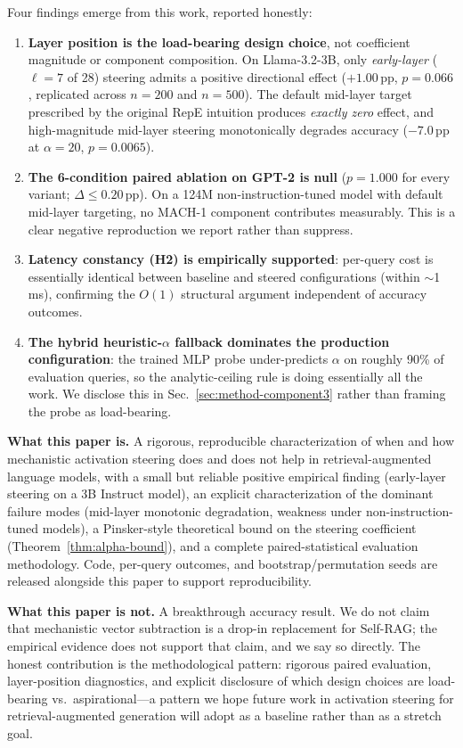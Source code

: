 \documentclass[conference]{IEEEtran}
\begin{document}
Four findings emerge from this work, reported honestly:

\begin{enumerate}
    \item \textbf{Layer position is the load-bearing design choice}, not coefficient magnitude or component composition. On Llama-3.2-3B, only \emph{early-layer} ($\ell\!=\!7$ of 28) steering admits a positive directional effect ($+1.00$\,pp, $p\!=\!0.066$, replicated across $n\!=\!200$ and $n\!=\!500$). The default mid-layer target prescribed by the original RepE intuition produces \emph{exactly zero} effect, and high-magnitude mid-layer steering monotonically degrades accuracy ($-7.0$\,pp at $\alpha\!=\!20$, $p\!=\!0.0065$).
    \item \textbf{The 6-condition paired ablation on GPT-2 is null} ($p\!=\!1.000$ for every variant; $\Delta \leq 0.20$\,pp). On a 124M non-instruction-tuned model with default mid-layer targeting, no MACH-1 component contributes measurably. This is a clear negative reproduction we report rather than suppress.
    \item \textbf{Latency constancy (H2) is empirically supported}: per-query cost is essentially identical between baseline and steered configurations (within $\sim$1\,ms), confirming the $O(1)$ structural argument independent of accuracy outcomes.
    \item \textbf{The hybrid heuristic-$\alpha$ fallback dominates the production configuration}: the trained MLP probe under-predicts $\alpha$ on roughly 90\% of evaluation queries, so the analytic-ceiling rule is doing essentially all the work. We disclose this in Sec.~\ref{sec:method-component3} rather than framing the probe as load-bearing.
\end{enumerate}

\textbf{What this paper is.} A rigorous, reproducible characterization of when and how mechanistic activation steering does and does not help in retrieval-augmented language models, with a small but reliable positive empirical finding (early-layer steering on a 3B Instruct model), an explicit characterization of the dominant failure modes (mid-layer monotonic degradation, weakness under non-instruction-tuned models), a Pinsker-style theoretical bound on the steering coefficient (Theorem~\ref{thm:alpha-bound}), and a complete paired-statistical evaluation methodology. Code, per-query outcomes, and bootstrap/permutation seeds are released alongside this paper to support reproducibility.

\textbf{What this paper is not.} A breakthrough accuracy result. We do not claim that mechanistic vector subtraction is a drop-in replacement for Self-RAG; the empirical evidence does not support that claim, and we say so directly. The honest contribution is the methodological pattern: rigorous paired evaluation, layer-position diagnostics, and explicit disclosure of which design choices are load-bearing vs.\ aspirational---a pattern we hope future work in activation steering for retrieval-augmented generation will adopt as a baseline rather than as a stretch goal.
\end{document}
